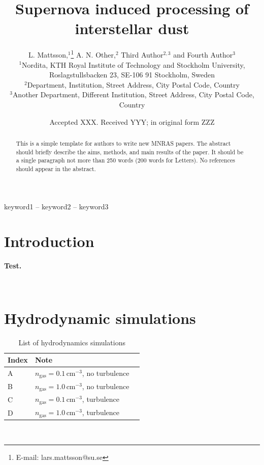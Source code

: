 \documentclass[fleqn,usenatbib]{mnras}
\title[Supernova induced processing of interstellar dust]{Supernova induced processing of interstellar dust}
\author[L. Mattsson et al.]{
L. Mattsson,$^{1}$\thanks{E-mail: lars.mattsson@su.se}
A. N. Other,$^{2}$
Third Author$^{2,3}$
and Fourth Author$^{3}$
\\
$^{1}$Nordita, KTH Royal Institute of Technology and Stockholm University, Roslagstullsbacken 23, SE-106 91 Stockholm, Sweden\\
$^{2}$Department, Institution, Street Address, City Postal Code, Country\\
$^{3}$Another Department, Different Institution, Street Address, City Postal Code, Country
}
\date{Accepted XXX. Received YYY; in original form ZZZ}
\newcommand{\fk}[1]{{\bf \textcolor{PineGreen}{#1}}}		%
\begin{document}
\label{firstpage}
\pagerange{\pageref{firstpage}--\pageref{lastpage}}
\maketitle

\begin{abstract}
This is a simple template for authors to write new MNRAS papers.
The abstract should briefly describe the aims, methods, and main results of the paper.
It should be a single paragraph not more than 250 words (200 words for Letters).
No references should appear in the abstract.
\end{abstract}

\begin{keywords}
keyword1 -- keyword2 -- keyword3
\end{keywords}



\section{Introduction}
\fk{Test.}

\newpage~
\newpage
\section{Hydrodynamic simulations}
 \begin{table}
 \centering
 \caption{List of hydrodynamics simulations}
 \begin{tabular}{ l l l}
 \hline\hline
 Index&Note&\\\hline 
 A&$n_\text{gas}=0.1\,\text{cm}^{-3}$, no turbulence&\\\hline  
 B&$n_\text{gas}=1.0\,\text{cm}^{-3}$, no turbulence&\\\hline   
 C&$n_\text{gas}=0.1\,\text{cm}^{-3}$, turbulence&\\\hline  
 D&$n_\text{gas}=1.0\,\text{cm}^{-3}$, turbulence&\\\hline   
 \end{tabular}
 \label{List_hydrosimulations}
 \end{table}

\newpage~
\newpage
\end{document}
